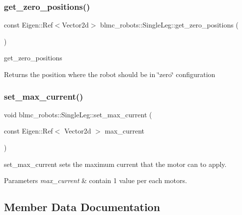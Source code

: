 \subsubsection{\texorpdfstring{get\+\_\+zero\+\_\+positions()}{get\_zero\_positions()}}
{\footnotesize\ttfamily const Eigen\+::\+Ref$<$Vector2d$>$ blmc\+\_\+robots\+::\+Single\+Leg\+::get\+\_\+zero\+\_\+positions (\begin{DoxyParamCaption}{ }\end{DoxyParamCaption})\hspace{0.3cm}{\ttfamily [inline]}}



get\+\_\+zero\+\_\+positions 

\begin{DoxyReturn}{Returns}
the position where the robot should be in \char`\"{}zero\char`\"{} configuration 
\end{DoxyReturn}
\mbox{\label{classblmc__robots_1_1SingleLeg_a54007e95c258ec05b63169f202d3a3a0}} 
\subsubsection{\texorpdfstring{set\+\_\+max\+\_\+current()}{set\_max\_current()}}
{\footnotesize\ttfamily void blmc\+\_\+robots\+::\+Single\+Leg\+::set\+\_\+max\+\_\+current (\begin{DoxyParamCaption}\item[{const Eigen\+::\+Ref$<$ Vector2d $>$}]{max\+\_\+current }\end{DoxyParamCaption})\hspace{0.3cm}{\ttfamily [inline]}}



set\+\_\+max\+\_\+current sets the maximum current that the motor can to apply. 


\begin{DoxyParams}{Parameters}
{\em max\+\_\+current} & contain 1 value per each motors. \\
\hline
\end{DoxyParams}


\subsection{Member Data Documentation}
\mbox{\label{classblmc__robots_1_1SingleLeg_a021418412c79cfa868bfffec24155ef8}} 
